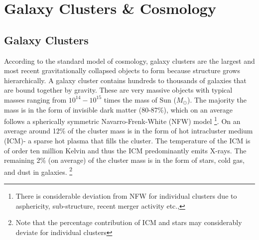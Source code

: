 \section{Galaxy Clusters \& Cosmology}
\subsection{Galaxy Clusters}
According to the standard model of cosmology, galaxy clusters are the largest and most recent gravitationally collapsed objects to form because structure grows hierarchically. 
A galaxy cluster contains hundreds to thousands of galaxies that are bound together by gravity.
These are very massive objects with typical masses ranging from $10^{14} - 10^{15} $ times the mass of Sun ($M_{\odot}$). %
The majority the mass is in the form of invisible dark matter (80-87\%), which on an average follows a spherically symmetric Navarro-Frenk-White (NFW) model  \citep{navarro97}\footnote{There is considerable deviation from NFW for individual clusters due to asphericity, sub-structure, recent merger activity etc.,}. 
On an average around 12\% of the cluster mass is in the form of hot intracluster medium (ICM)- a sparse hot plasma that fills the cluster. 
The temperature of the ICM is of order ten million Kelvin and thus the ICM predominantly emits X-rays. 
The remaining 2\% (on average) of the cluster mass is in the form of stars, cold gas, and dust in galaxies. \footnote{ Note that the percentage contribution of ICM and stars may considerably deviate for individual clusters}
